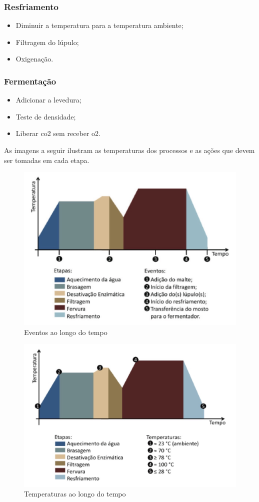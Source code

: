 \subsubsection{Resfriamento}
\begin{itemize}
    \item Diminuir a temperatura para a temperatura ambiente;
    \item Filtragem do lúpulo;
    \item Oxigenação.
\end{itemize}


\subsubsection{Fermentação}
\begin{itemize}
    \item Adicionar a levedura;
    \item Teste de densidade;
    \item Liberar co2 sem receber o2.
\end{itemize}

As imagens a seguir ilustram as temperaturas dos processos e as ações que devem ser tomadas em cada etapa.

\begin{figure}[h]
    \centering
    \includegraphics[scale=0.2]{images/grafico1.png}
    \caption{Eventos ao longo do tempo}
\end{figure}

\begin{figure}[h]
    \centering
    \includegraphics[scale=0.2]{images/grafico2.png}
    \caption{Temperaturas ao longo do tempo}
\end{figure}